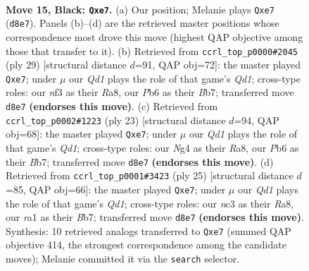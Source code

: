 \documentclass[11pt]{article}
\begin{document}
\clearpage

\begin{figure}[p]\centering
\begin{subfigure}{0.46\textwidth}\centering
\resizebox{\linewidth}{!}{%
\newchessgame
\chessboard[
  setfen={1nbq1rk1/r3Bpp1/pp1p4/4p2p/PP2P1n1/2NB1N2/2PQ1PPP/R4RK1 b - - 0 15},
  showmover=false,
  pgfstyle=straightmove, color=movearrow, markmove={d8-e7}
]}
\caption{}
\end{subfigure}\hfill
\begin{subfigure}{0.46\textwidth}\centering
\resizebox{\linewidth}{!}{%
\newchessgame
\chessboard[
  setfen={r2q1rk1/1bpnBppp/p3p3/1p1n4/3P4/P1N1PN2/QP2BPPP/R2R2K1 b - - 0 15},
  showmover=false,
  pgfstyle=straightmove, color=movearrow, markmove={d8-e7}
]}
\caption{}
\end{subfigure}
\\[4pt]
\begin{subfigure}{0.46\textwidth}\centering
\resizebox{\linewidth}{!}{%
\newchessgame
\chessboard[
  setfen={r2q1rk1/pbpnBpp1/1p5p/3p4/3Pn3/2N1PN2/PPQ1BPPP/R4RK1 b - - 0 12},
  showmover=false,
  pgfstyle=straightmove, color=movearrow, markmove={d8-e7}
]}
\caption{}
\end{subfigure}\hfill
\begin{subfigure}{0.46\textwidth}\centering
\resizebox{\linewidth}{!}{%
\newchessgame
\chessboard[
  setfen={r2q1rk1/pb1nBpp1/1p5p/2pp3n/3P4/2NBPN2/PPQ2PPP/R2R2K1 b - - 0 13},
  showmover=false,
  pgfstyle=straightmove, color=movearrow, markmove={d8-e7}
]}
\caption{}
\end{subfigure}
\caption{\textbf{Move 15, Black: \texttt{Qxe7}.} (a) Our position; Melanie plays \texttt{Qxe7} (\texttt{d8e7}). Panels (b)--(d) are the retrieved master positions whose correspondence most drove this move (highest QAP objective among those that transfer to it). (b) Retrieved from \texttt{ccrl\_top\_p0000\#2045} (ply 29) [structural distance $d$=91, QAP obj=72]: the master played \texttt{Qxe7}; under $\mu$ our \emph{Qd1} plays the role of that game's \emph{Qd1}; cross-type roles: our \emph{n}f3 as their \emph{R}a8, our \emph{P}b6 as their \emph{B}b7; transferred move \texttt{d8e7} \textbf{(endorses this move)}. (c) Retrieved from \texttt{ccrl\_top\_p0002\#1223} (ply 23) [structural distance $d$=94, QAP obj=68]: the master played \texttt{Qxe7}; under $\mu$ our \emph{Qd1} plays the role of that game's \emph{Qd1}; cross-type roles: our \emph{N}g4 as their \emph{R}a8, our \emph{P}b6 as their \emph{B}b7; transferred move \texttt{d8e7} \textbf{(endorses this move)}. (d) Retrieved from \texttt{ccrl\_top\_p0001\#3423} (ply 25) [structural distance $d$=85, QAP obj=66]: the master played \texttt{Qxe7}; under $\mu$ our \emph{Qd1} plays the role of that game's \emph{Qd1}; cross-type roles: our \emph{n}c3 as their \emph{R}a8, our \emph{r}a1 as their \emph{B}b7; transferred move \texttt{d8e7} \textbf{(endorses this move)}. Synthesis: 10 retrieved analogs transferred to \texttt{Qxe7} (summed QAP objective 414, the strongest correspondence among the candidate moves); Melanie committed it via the \texttt{search} selector.}
\label{fig:thought-m29}
\end{figure}
\end{document}
